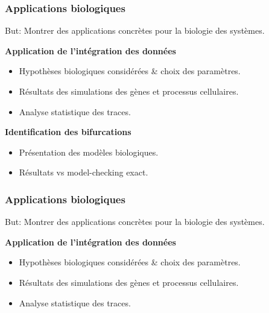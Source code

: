 \begin{frame}[c]
 \frametitle{Applications biologiques}
 
 But: Montrer des applications concrètes pour la biologie des systèmes. 
 
 \medskip
 \pause
 \textbf{Application de l'intégration des données}
 \begin{itemize}
  \item Hypothèses biologiques considérées \& choix des paramètres.
  \item Résultats des simulations des gènes et processus cellulaires.
  \item Analyse statistique des traces.
 \end{itemize}
 
 \medskip
 \pause
\textbf{Identification des bifurcations}
\begin{itemize}
 \item Présentation des modèles biologiques.
 \item Résultats vs model-checking exact.
\end{itemize}

\end{frame}

\begin{frame}[c]
 \frametitle{Applications biologiques}
 
 But: Montrer des applications concrètes pour la biologie des systèmes. 
 
 \medskip
 
 \textbf{Application de l'intégration des données}
 \begin{itemize}
  \item Hypothèses biologiques considérées \& choix des paramètres.
  \item Résultats des simulations des gènes et processus cellulaires.
  \item Analyse statistique des traces.
 \end{itemize}
 
 \medskip
\end{frame}
